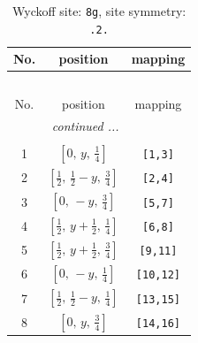 \documentclass[fleqn,8pt]{jsarticle}
\begin{document}
\begin{longtable}{ccc}
\caption{Wyckoff site: {\tt 8g}, site symmetry: {\tt .2.}}
 \\
 \hline \hline
No. & position & mapping \\ \hline \endfirsthead

\multicolumn{2}{l}{\tablename\ \thetable{}} \\
 \hline \hline
No. & position & mapping \\ \hline \endhead

 \hline \hline
\multicolumn{2}{r}{\footnotesize\it continued ...} \\ \endfoot

 \hline \hline
\multicolumn{2}{r}{} \\ \endlastfoot

1 & $\left[ 0,\, y,\, \frac{1}{4} \right]$ & {\tt [1,3]} \\ \hline
2 & $\left[ \frac{1}{2},\, \frac{1}{2} - y,\, \frac{3}{4} \right]$ & {\tt [2,4]} \\ \hline
3 & $\left[ 0,\, - y,\, \frac{3}{4} \right]$ & {\tt [5,7]} \\ \hline
4 & $\left[ \frac{1}{2},\, y + \frac{1}{2},\, \frac{1}{4} \right]$ & {\tt [6,8]} \\ \hline
5 & $\left[ \frac{1}{2},\, y + \frac{1}{2},\, \frac{3}{4} \right]$ & {\tt [9,11]} \\ \hline
6 & $\left[ 0,\, - y,\, \frac{1}{4} \right]$ & {\tt [10,12]} \\ \hline
7 & $\left[ \frac{1}{2},\, \frac{1}{2} - y,\, \frac{1}{4} \right]$ & {\tt [13,15]} \\ \hline
8 & $\left[ 0,\, y,\, \frac{3}{4} \right]$ & {\tt [14,16]} \\
\end{longtable}
\renewcommand{\arraystretch}{1.2}
\end{document}
